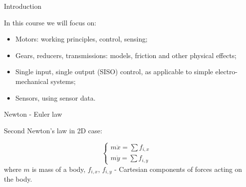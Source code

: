 \documentclass{beamer}
\begin{document}
\begin{frame}{Introduction}
	\begin{flushleft}
		
		
		In this course we will focus on:
		
		\begin{itemize}
			\item Motors: working principles, control, sensing;
			
			\item Gears, reducers, transmissions: models, friction and other physical effects;
			
			\item Single input, single output (SISO) control, as applicable to simple electro-mechanical systems;
			
			\item Sensors, using sensor data.
			
		\end{itemize}		
		
		
	\end{flushleft}
\end{frame}



\begin{frame}{Newton - Euler law}
\begin{flushleft}

Second Newton's law in 2D case:

\begin{equation}
	\begin{cases}
		m \ddot x = \sum f_{i, x} \\
		m \ddot y = \sum f_{i, y}
	\end{cases}
\end{equation}
%
where $m$ is mass of a body, $f_{i, x}$, $f_{i, y}$ - Cartesian components of forces acting on the body. 

\end{flushleft}
\end{frame}
\end{document}
